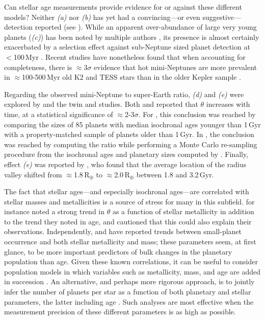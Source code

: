 \documentclass[11pt,twocolumn,tighten]{aastex63}
\begin{document}
Can stellar age measurements provide evidence for or against
these different models?  Neither {\it (a)} nor {\it (b)} has yet had a
convincing---or even suggestive--- detection reported (see
\citealt{Petigura_2022}).  While an apparent over-abundance of large
very young planets ({\it (c)}) has been noted by multiple authors
\citep[e.g.][]{2017AJ....153...64M,Bouma_2020}, its presence is almost certainly
exacerbated by a selection effect against sub-Neptune sized planet
detection at $<$100\,Myr \citep{Zhou_2021,Bouma_2022b}.  Recent studies have
nonetheless found that when accounting for completeness, there is
$\approx$3$\sigma$ evidence that hot mini-Neptunes are more prevalent in
$\approx$100-500\,Myr old K2 \citep{2023AJ....166..248C} and TESS
\citep{2024arXiv240303261V} stars than in the older Kepler sample
\citep[e.g.][]{2020AJ....159..248K}.

Regarding the observed mini-Neptune to super-Earth ratio, {\it (d)} and {\it
(e)} were explored by \citet{Berger_2020b_rpage} and the twin
\citet{David_2021} and \citet{Sandoval_2021} studies.  Both
\citet{Berger_2020b_rpage} and \citet{Sandoval_2021} reported that $\theta$
increases with time, at a statistical significance of $\approx$2-3$\sigma$.
For \citet{Berger_2020b_rpage}, this conclusion was reached by comparing the
sizes of 85 planets with median isochronal ages younger than 1\,Gyr with a
property-matched sample of planets older than 1\,Gyr.  In
\citet{Sandoval_2021}, the conclusion was reached by computing the ratio while
performing a Monte Carlo re-sampling procedure from the isochronal ages and
planetary sizes computed by \citet{Fulton_Petigura_2018_cks_vii}.  Finally,
effect {\it (e)} was reported by \citet{David_2021}, who found that the average
location of the radius valley shifted from $\approx$1.8\,R$_\oplus$ to
$\approx$2.0\,R$_\oplus$ between 1.8 and 3.2\,Gyr.

The fact that stellar ages---and especially isochronal ages---are
correlated with stellar masses and metallicities is a source of stress
for many in this subfield.  \citet{Sandoval_2021} for instance noted a
strong trend in $\theta$ as a function of stellar metallicity in
addition to the trend they noted in age, and cautioned that this could
also explain their observations.  Independently, \citet{Petigura_2018}
and \citet{Petigura_2022} have reported trends between small-planet
occurrence and both stellar metallicity and mass; these parameters
seem, at first glance, to be more important predictors of bulk changes
in the planetary population than age.  Given these known correlations,
it can be useful to consider population models in which variables such
as metallicity, mass, and age are added in succession
\citep[e.g.][]{Thorngren_2021}.  An alternative, and perhaps more
rigorous approach, is to jointly infer the number of planets per star
as a function of both planetary and stellar parameters, the latter
including age \citep[e.g.][]{2023AJ....166..209M}.  Such analyses are
most effective when the measurement precision of these different
parameters is as high as possible.
\end{document}
